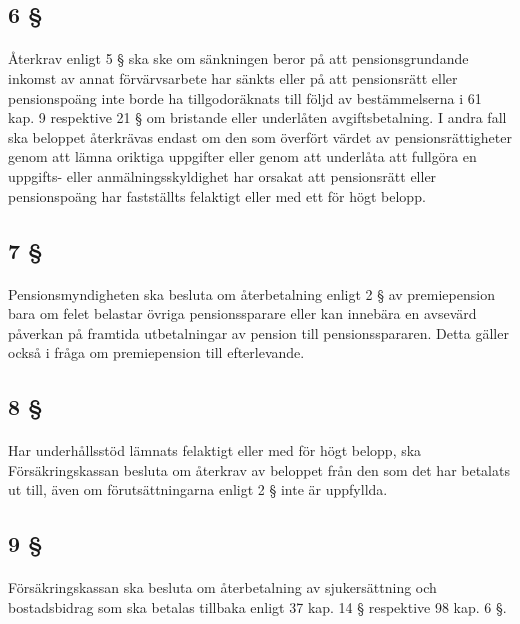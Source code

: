 \documentclass[a4paper,notitlepage,openany,10pt]{book}
\begin{document}
\subsection*{6 §}
\paragraph*{}
Återkrav enligt 5 § ska ske om sänkningen beror på att pensionsgrundande inkomst av annat förvärvsarbete har sänkts eller på att pensionsrätt eller pensionspoäng inte borde ha tillgodoräknats till följd av bestämmelserna i 61 kap. 9 respektive 21 § om bristande eller underlåten avgiftsbetalning. I andra fall ska beloppet återkrävas endast om den som överfört värdet av pensionsrättigheter genom att lämna oriktiga uppgifter eller genom att underlåta att fullgöra en uppgifts- eller anmälningsskyldighet har orsakat att pensionsrätt eller pensionspoäng har fastställts felaktigt eller med ett för högt belopp.
\subsection*{7 §}
\paragraph*{}
Pensionsmyndigheten ska besluta om återbetalning enligt 2 § av premiepension bara om felet belastar övriga pensionssparare eller kan innebära en avsevärd påverkan på framtida utbetalningar av pension till pensionsspararen. Detta gäller också i fråga om premiepension till efterlevande.
\subsection*{8 §}
\paragraph*{}
Har underhållsstöd lämnats felaktigt eller med för högt belopp, ska Försäkringskassan besluta om återkrav av beloppet från den som det har betalats ut till, även om förutsättningarna enligt 2 § inte är uppfyllda.
\subsection*{9 §}
\paragraph*{}
Försäkringskassan ska besluta om återbetalning av sjukersättning och bostadsbidrag som ska betalas tillbaka enligt 37 kap. 14 § respektive 98 kap. 6 §.
\end{document}
